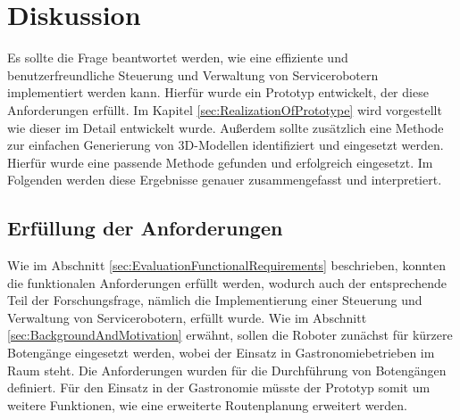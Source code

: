 \newpage
\section{Diskussion}
Es sollte die Frage beantwortet werden, wie eine effiziente und benutzerfreundliche Steuerung und Verwaltung von Servicerobotern implementiert werden kann. Hierfür wurde ein Prototyp entwickelt, der diese Anforderungen erfüllt. Im Kapitel \ref{sec:RealizationOfPrototype} wird vorgestellt wie dieser im Detail entwickelt wurde. Außerdem sollte zusätzlich eine Methode zur einfachen Generierung von 3D-Modellen identifiziert und eingesetzt werden. Hierfür wurde eine passende Methode gefunden und erfolgreich eingesetzt. Im Folgenden werden diese Ergebnisse genauer zusammengefasst und interpretiert.

\subsection{Erfüllung der Anforderungen}
Wie im Abschnitt \ref{sec:EvaluationFunctionalRequirements} beschrieben, konnten die funktionalen Anforderungen erfüllt werden, wodurch auch der entsprechende Teil der Forschungsfrage, nämlich die Implementierung einer Steuerung und Verwaltung von Servicerobotern, erfüllt wurde. Wie im Abschnitt \ref{sec:BackgroundAndMotivation} erwähnt, sollen die Roboter zunächst für kürzere Botengänge eingesetzt werden, wobei der Einsatz in Gastronomiebetrieben im Raum steht. Die Anforderungen wurden für die Durchführung von Botengängen definiert. Für den Einsatz in der Gastronomie müsste der Prototyp somit um weitere Funktionen, wie eine erweiterte Routenplanung erweitert werden.

